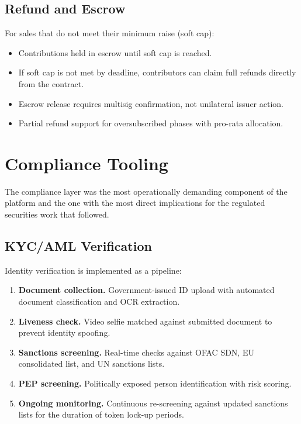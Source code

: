 \documentclass[11pt,letterpaper]{article}
\begin{document}
\subsection{Refund and Escrow}

For sales that do not meet their minimum raise (soft cap):

\begin{itemize}[leftmargin=1.2em]
    \item Contributions held in escrow until soft cap is reached.
    \item If soft cap is not met by deadline, contributors can claim full
    refunds directly from the contract.
    \item Escrow release requires multisig confirmation, not unilateral
    issuer action.
    \item Partial refund support for oversubscribed phases with pro-rata
    allocation.
\end{itemize}

\section{Compliance Tooling}
\label{sec:compliance}

The compliance layer was the most operationally demanding component of the
platform and the one with the most direct implications for the regulated
securities work that followed.

\subsection{KYC/AML Verification}

Identity verification is implemented as a pipeline:

\begin{enumerate}[leftmargin=1.2em]
    \item \textbf{Document collection.} Government-issued ID upload with
    automated document classification and OCR extraction.
    \item \textbf{Liveness check.} Video selfie matched against submitted
    document to prevent identity spoofing.
    \item \textbf{Sanctions screening.} Real-time checks against OFAC SDN,
    EU consolidated list, and UN sanctions lists.
    \item \textbf{PEP screening.} Politically exposed person identification
    with risk scoring.
    \item \textbf{Ongoing monitoring.} Continuous re-screening against updated
    sanctions lists for the duration of token lock-up periods.
\end{enumerate}
\end{document}
